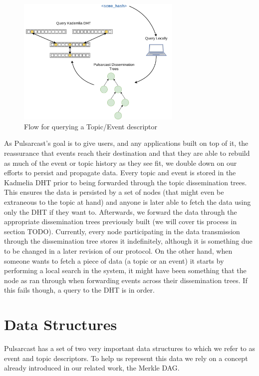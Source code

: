 \begin{figure}[hb!]
  \centering
  \includegraphics[width=0.7\textwidth]{img/pulsarcast-descriptor-query.png}
  \caption{Flow for querying a Topic/Event descriptor}
  \label{fig:pulsarcast-descriptor-query}
\end{figure}

As Pulsarcast's goal is to give users, and any applications built on top of it,
the reassurance that events reach their destination and that they are able to
rebuild as much of the event or topic history as they see fit, we double down
on our efforts to persist and propagate data. Every topic and event is stored
in the Kadmelia DHT prior to being forwarded through the topic dissemination
trees. This ensures the data is persisted by a set of nodes (that might even be
extraneous to the topic at hand) and anyone is later able to fetch the data
using only the DHT if they want to. Afterwards, we forward the data through the
appropriate dissemination trees previously built (we will cover tis process in
section TODO). Currently, every node participating in the data transmission
through the dissemination tree stores it indefinitely, although it is something
due to be changed in a later revision of our protocol. On the other hand, when
someone wants to fetch a piece of data (a topic or an event) it starts by
performing a local search in the system, it might have been something that the
node as ran through when forwarding events across their dissemination trees. If
this fails though, a query to the DHT is in order.

\section{Data Structures}\label{data-structures}

Pulsarcast has a set of two very important data structures to which we refer to
as event and topic descriptors. To help us represent this data we rely on a
concept already introduced in our related work, the Merkle DAG.

